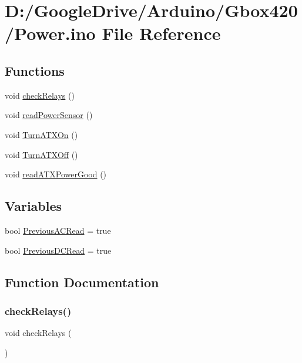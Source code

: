 \hypertarget{_power_8ino}{}\section{D\+:/\+Google\+Drive/\+Arduino/\+Gbox420/\+Power.ino File Reference}
\label{_power_8ino}
\subsection*{Functions}
\begin{DoxyCompactItemize}
\item 
void \mbox{\hyperlink{_power_8ino_a64808953539da45008f829744cfad36a}{check\+Relays}} ()
\item 
void \mbox{\hyperlink{_power_8ino_a37c3304dd7012a9e15a3a82194493459}{read\+Power\+Sensor}} ()
\item 
void \mbox{\hyperlink{_power_8ino_a5c5e1cbad55f5a7e06793160b8aacc57}{Turn\+A\+T\+X\+On}} ()
\item 
void \mbox{\hyperlink{_power_8ino_a8fb9dfef337ef5d83a61495d851c84d8}{Turn\+A\+T\+X\+Off}} ()
\item 
void \mbox{\hyperlink{_power_8ino_accba2cf07e246d7537b271091aa207a6}{read\+A\+T\+X\+Power\+Good}} ()
\end{DoxyCompactItemize}
\subsection*{Variables}
\begin{DoxyCompactItemize}
\item 
bool \mbox{\hyperlink{_power_8ino_a0708082474eb2305081375bd7157dcf8}{Previous\+A\+C\+Read}} = true
\item 
bool \mbox{\hyperlink{_power_8ino_ae8027d359126c483a6bdc7aa0de85264}{Previous\+D\+C\+Read}} = true
\end{DoxyCompactItemize}


\subsection{Function Documentation}
\mbox{\label{_power_8ino_a64808953539da45008f829744cfad36a}} 
\subsubsection{\texorpdfstring{checkRelays()}{checkRelays()}}
{\footnotesize\ttfamily void check\+Relays (\begin{DoxyParamCaption}{ }\end{DoxyParamCaption})}



